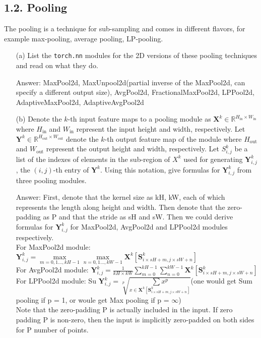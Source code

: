\documentclass[12pt,letterpaper]{article}
\newcommand{\matr}[1]{\bm{#1}}     %
\begin{document}
 

\newpage
\subsection*{1.2. Pooling}
The pooling is a technique for sub-sampling and comes in different flavors, for example max-pooling, average pooling, LP-pooling. 
\begin{itemize}
    \item[(a)] List the \texttt{torch.nn} modules for the 2D versions of these pooling techniques and read on what they do.
    
    Answer: MaxPool2d, MaxUnpool2d(partial inverse of the MaxPool2d, can specify a different output size), AvgPool2d, FractionalMaxPool2d, LPPool2d, AdaptiveMaxPool2d, AdaptiveAvgPool2d
    
    \item[(b)] Denote the $k$-th input feature maps to a pooling module as $\matr{X}^k \in \mathbb{R}^{H_{\textrm{in}}\times W_{\textrm{in}}} $ where $H_{\textrm{in}}$ and $W_{\text{in}}$ represent the input height and width, respectively. Let $\matr{Y}^k \in \mathbb{R}^{H_{\text{out}}\times W_{\textrm{out}}}$ denote the $k$-th output feature map of the module where $H_{\textrm{out}}$ and $W_{\textrm{out}}$ represent the output height and width, respectively. Let $S^{k}_{i,j}$ be a list of the indexes of elements in the sub-region of $X^k $ used for generating $\matr{Y}^k_{i,j}$, the $(i,j)$-th entry of $\matr{Y}^{k}$. 
    Using this notation, give formulas for $\matr{Y}^k_{i,j} $ from three pooling modules.
    
    Answer: First, denote that the kernel size as kH, kW, each of which represents the length along height and width. Then denote that the zero-padding as P and that the stride as sH and sW. Then we could derive formulas for $\matr{Y}^k_{i,j}$ for MaxPool2d, AvgPool2d and LPPool2d modules respectively.\\
    
    For MaxPool2d module: 
    $
    \matr{Y}^k_{i,j} = \underset{m=0,1\ldots,kH-1}{\max}
    \underset{n=0,1\ldots,kW-1}{\max}
    \matr{X}^k[\matr{S}^k_{i \times sH + m, j \times sW + n}]
    $\\
    For AvgPool2d module: 
    $
    \matr{Y}^k_{i,j} =
    \frac{1}{kH\times kW}\sum_{m=0}^{kH-1}\sum_{n=0}^{kW-1}
    \matr{X}^k[\matr{S}^k_{i \times sH + m, j \times sW + n}]
    $\\
    For LPPool2d module: Su
    $
    \matr{Y}^k_{i,j} = \sqrt[p]{\underset{x\in\matr{X}^k[\matr{S}^k_{i \times sH + m, j \times sW + n}]}{\sum x^p}}
    $\quad (one would get Sum pooling if p = 1, or woule get Max pooling if p = $\infty$)
    \\
    Note that the zero-padding P is actually included in the input. If zero padding P is non-zero, then the input is implicitly zero-padded on both sides for P number of points. 
    

\end{itemize}
\end{document}
